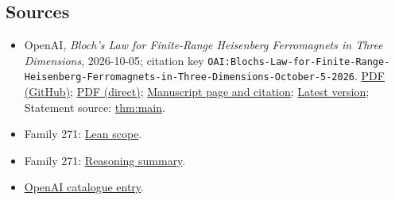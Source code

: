 \documentclass[11pt]{article}
\begin{document}
\subsection{Sources}
\begin{itemize}
\item OpenAI, \emph{Bloch's Law for Finite-Range Heisenberg Ferromagnets in Three Dimensions}, 2026-10-05; citation key \texttt{OAI:Blochs-Law-for-Finite-Range-Heisenberg-Ferromagnets-in-Three-Dimensions-October-5-2026}. \href{https://github.com/openai/math/blob/adc7f1241b42e322a6451854ab7e4b4c146bf78a/preprints/Blochs-Law-for-Finite-Range-Heisenberg-Ferromagnets-in-Three-Dimensions-October-5-2026/bloch-law-heisenberg.pdf}{PDF (GitHub)}; \href{https://github.com/openai/math/raw/adc7f1241b42e322a6451854ab7e4b4c146bf78a/preprints/Blochs-Law-for-Finite-Range-Heisenberg-Ferromagnets-in-Three-Dimensions-October-5-2026/bloch-law-heisenberg.pdf}{PDF (direct)}; \href{https://github.com/openai/math/blob/adc7f1241b42e322a6451854ab7e4b4c146bf78a/preprints/Blochs-Law-for-Finite-Range-Heisenberg-Ferromagnets-in-Three-Dimensions-October-5-2026/README.md}{Manuscript page and citation}; \href{https://github.com/openai/math/blob/main/preprints/Blochs-Law-for-Finite-Range-Heisenberg-Ferromagnets-in-Three-Dimensions-October-5-2026/bloch-law-heisenberg.pdf}{Latest version}; Statement source: \href{https://github.com/openai/math/blob/adc7f1241b42e322a6451854ab7e4b4c146bf78a/preprints/Blochs-Law-for-Finite-Range-Heisenberg-Ferromagnets-in-Three-Dimensions-October-5-2026/build/sections/01-introduction.tex\#L68}{thm:main}.
\item Family 271: \href{https://github.com/openai/math/blob/adc7f1241b42e322a6451854ab7e4b4c146bf78a/lean/docs/271.md}{Lean scope}.
\item Family 271: \href{https://github.com/openai/math/blob/adc7f1241b42e322a6451854ab7e4b4c146bf78a/reasoning\_traces/spontaneous-magnetization-quantum-heisenberg-ferromagnet.pdf}{Reasoning summary}.
\item \href{https://github.com/openai/math/blob/adc7f1241b42e322a6451854ab7e4b4c146bf78a/CONTENTS.md}{OpenAI catalogue entry}.
\end{itemize}
\end{document}
